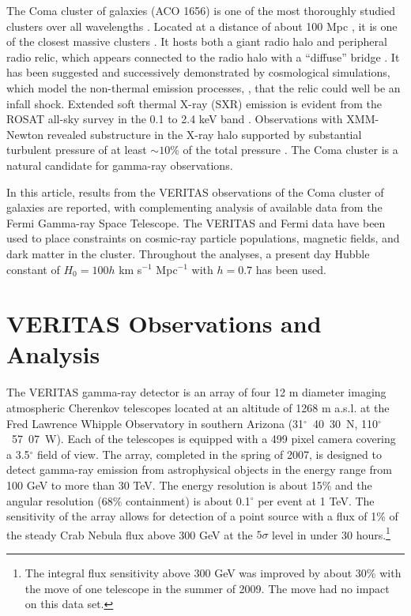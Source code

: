 \documentclass[12pt,manuscript]{aastex}
\begin{document}
The Coma cluster of galaxies (ACO 1656) is one of the most thoroughly studied clusters over all
wavelengths \citep{article:Voges_etal:1999}. Located at a distance of about 100 Mpc
\citep[$z=0.023$;][]{article:StrubleRood:1999}, it is one of the closest massive clusters \citep[$M
\sim10^{15}M_{\odot}$;][]{article:Smith:1983, article:Kubo_etal:2008}. It hosts both a giant radio
halo \citep{article:Giovannini_etal:1993,article:Thierbach_etal:2003} and peripheral radio relic,
which appears connected to the radio halo with a ``diffuse'' bridge \citep[see discussion
in][]{article:BrownRudnick:2010}. It has been suggested \citep{article:Ensslin_etal:1998} and
successively demonstrated by cosmological simulations, which model the non-thermal emission
processes, \citep{article:PfrommerEnsslinSpringel:2008, article:Pfrommer:2008,
  article:Battaglia_etal:2009, article:Skillman_etal:2011}, that the relic could well be an infall
shock. Extended soft thermal X-ray (SXR) emission is evident from the ROSAT all-sky survey in the
0.1 to 2.4 keV band \citep{article:BrielHenryBohringer:1992}. Observations with XMM-Newton
\citep{article:Briel_etal:2001} revealed substructure in the X-ray halo supported by substantial
turbulent pressure of at least $\sim 10 \%$ of the total pressure
\citep{article:Schuecker_etal:2004}. The Coma cluster is a natural candidate for gamma-ray
observations.

In this article, results from the VERITAS observations of the Coma cluster of galaxies are
reported, with complementing analysis of available data from the Fermi Gamma-ray Space Telescope.
The VERITAS and Fermi data have been used to place constraints on cosmic-ray particle populations,
magnetic fields, and dark matter in the cluster. Throughout the analyses, a present day Hubble
constant of $H_{0} = 100h$ km s$^{-1}$ Mpc$^{-1}$ with $h=0.7$ has been used.

%
%

\section{VERITAS Observations and Analysis}
The VERITAS gamma-ray detector \citep{article:Weekes_etal:2002} is an array of four 12 m diameter
imaging atmospheric Cherenkov telescopes \citep[IACTs;][]{article:Holder_etal:2006} located at an
altitude of 1268 m a.s.l. at the Fred Lawrence Whipple Observatory in southern Arizona
(31$^{\circ}$~40\arcmin~30\arcsec~N, 110$^{\circ}$~57\arcmin~07\arcsec~W). Each of the telescopes
is equipped with a 499 pixel camera covering a 3.5$^{\circ}$ field of view. The array, completed in
the spring of 2007, is designed to detect gamma-ray emission from astrophysical objects in the
energy range from 100 GeV to more than 30 TeV. The energy resolution is about 15\% and the angular
resolution (68\% containment) is about 0.1$^{\circ}$ per event at 1 TeV. The sensitivity of the
array allows for detection of a point source with a flux of 1\% of the steady Crab Nebula flux
above 300 GeV at the $5\sigma$ level in under 30 hours.\footnote{The integral flux sensitivity
above 300 GeV was improved by about 30\% with the move of one telescope in the summer of 2009. The
move had no impact on this data set.}
\end{document}

